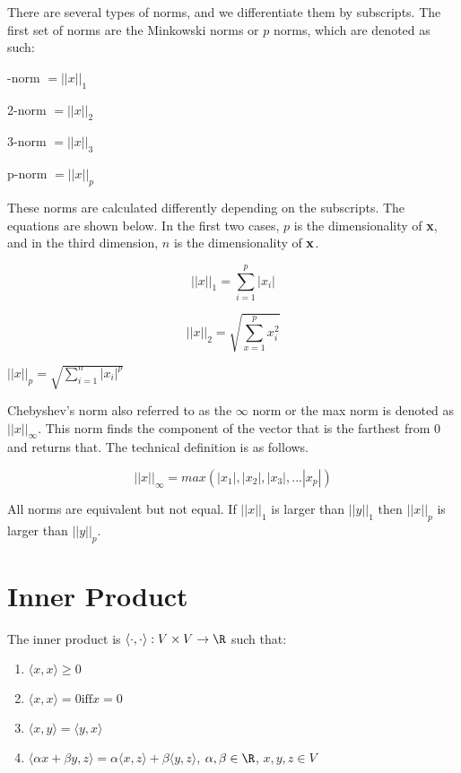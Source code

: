 There are several types of norms, and we differentiate them by subscripts. The first set of norms are the Minkowski norms or $p$ norms, which are denoted as such:

-norm $= ||x||_1$

2-norm $= ||x||_2$

3-norm $= ||x||_3$

p-norm $= ||x||_p$

\raggedright

These norms are calculated differently depending on the subscripts. The equations are shown below. In the first two cases, $p$ is the dimensionality of {\bf x}, and in the third dimension, $n$ is the dimensionality of ${\bf x}$.

\centering
$$||x||_1 = \sum_{i=1}^{p}|x_i|$$

$$||x||_2 = \sqrt{\sum_{x=1}^{p}x_i^2}$$

$||x||_p = \sqrt{\sum_{i=1}^{n}|x_i|^p}$

\raggedright

Chebyshev's norm also referred to as the $\infty$ norm or the max norm is denoted as $||x||_\infty$. This norm finds the component of the vector that is the farthest from 0 and returns that. The technical definition is as follows.

$$||x||_\infty = max(|x_1|, |x_2|, |x_3|, ... |x_p|)$$

All norms are equivalent but not equal. If $||x||_1$ is larger than $||y||_1$ then $||x||_p$ is larger than $||y||_p$.

\section{Inner Product}

The inner product is $\langle\cdot,\cdot\rangle: V \times V \rightarrow\R$ such that:

\begin{enumerate}
	\item $\langle x,x \rangle \geq 0$
	\item $\langle x,x \rangle = 0 \text{iff} x=0$
	\item $\langle x,y \rangle = \langle y,x \rangle$
	\item $\langle \alpha x+ \beta y,z \rangle = \alpha \langle x,z \rangle + \beta \langle y,z 			\rangle$,				$\alpha,\beta \in \R$,
			$x,y,z \in V$
\end{enumerate}


